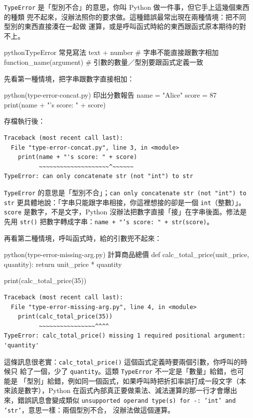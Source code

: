 \texttt{TypeError} 是「型別不合」的意思，你叫 Python 做一件事，但它手上這幾個東西的種類
兜不起來，沒辦法照你的要求做。這種錯誤最常出現在兩種情境：把不同型別的東西直接湊在一起做
運算，或是呼叫函式時給的東西跟函式原本期待的對不上。

\begin{code}{python}{TypeError 常見寫法}
text + number        # 字串不能直接跟數字相加
function_name(argument)     # 引數的數量／型別要跟函式定義一致
\end{code}

先看第一種情境，把字串跟數字直接相加：

\begin{example}{python}{(type-error-concat.py) 印出分數報告}
name = "Alice"
score = 87
print(name + "'s score: " + score)
\end{example}

存檔執行後：

\begin{verbatim}
Traceback (most recent call last):
  File "type-error-concat.py", line 3, in <module>
    print(name + "'s score: " + score)
          ~~~~~~~~~~~~~~~~~~~~^~~~~~~
TypeError: can only concatenate str (not "int") to str
\end{verbatim}

\texttt{TypeError} 的意思是「型別不合」；\texttt{can only concatenate str (not "int")
to str} 更具體地說：「字串只能跟字串相接，你這裡想接的卻是一個 \texttt{int}（整數）」。
\texttt{score} 是數字，不是文字，Python 沒辦法把數字直接「接」在字串後面。修法是先用
\texttt{str()} 把數字轉成字串：\texttt{name + "'s score: " + str(score)}。

再看第二種情境，呼叫函式時，給的引數兜不起來：

\begin{example}{python}{(type-error-missing-arg.py) 計算商品總價}
def calc_total_price(unit_price, quantity):
    return unit_price * quantity

print(calc_total_price(35))
\end{example}

\begin{verbatim}
Traceback (most recent call last):
  File "type-error-missing-arg.py", line 4, in <module>
    print(calc_total_price(35))
          ~~~~~~~~~~~~~~~~^^^^
TypeError: calc_total_price() missing 1 required positional argument: 'quantity'
\end{verbatim}

這條訊息很老實：\texttt{calc\_total\_price()} 這個函式定義時要兩個引數，你呼叫的時候只
給了一個，少了 \texttt{quantity}。這類 \texttt{TypeError} 不一定是「數量」給錯，也可能是
「型別」給錯，例如同一個函式，如果呼叫時把折扣率誤打成一段文字（本來該是數字），Python
在函式內部真正要做乘法、減法運算的那一行才會爆出來，錯誤訊息會變成類似
\texttt{unsupported operand type(s) for -: 'int' and 'str'}，意思一樣：兩個型別不合，
沒辦法做這個運算。

